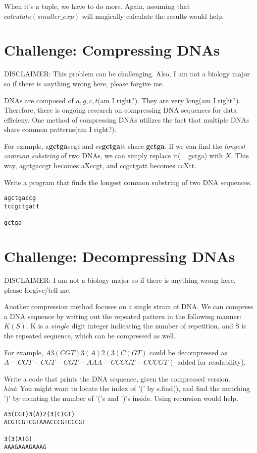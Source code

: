 \documentclass{article}
\begin{document}
When it's a tuple, we have to do more. Again, assuming that
$calculate(smaller\_exp)$ will magically calculate the results would help.\\

\section{Challenge: Compressing DNAs}
DISCLAIMER: This problem can be challenging. Also, I am not a biology major so if there is anything wrong here, please
forgive me.

DNAs are composed of $a,g,c,t$(am I right?). They are very long(am I right?).
Therefore, there is ongoing research on compressing DNA sequences for data
efficieny. One method of compressing DNAs utilizes the fact that multiple DNAs share
common patterns(am I right?).

For example, a\textbf{gctga}ccgt and cc\textbf{gctga}tt share \textbf{gctga}.
If we can find the \textit{longest common substring} of two DNAs, we can simply
replace it(= gctga) with $X$. This way, agctgaccgt becomes aXccgt, and ccgctgatt
becomes ccXtt.

Write a program that finds the longest common substring of two
DNA sequences.

\begin{lstlisting}
agctgaccg
tccgctgatt

gctga
\end{lstlisting}

\section{Challenge: Decompressing DNAs}
DISCLAIMER: I am not a biology major so if there is anything wrong here, please
forgive/tell me.

Another compression method focuses on a single strain of DNA. We can compress a DNA sequence by writing out the repeated pattern
in the following manner: $K(S)$. K is a $single$ digit integer indicating the number of
repetition, and S is the repeated sequence, which can be compressed as well.

For example, $A3(CGT)3(A)2(3(C)GT)$ could be decompressed as\\
$A-CGT-CGT-CGT-AAA-CCCGT-CCCGT$ (- added for readability).

Write a code that prints the DNA sequence, given the compressed version.\\
\textit{hint}: You might want to locate the index of '(' by s.find(), and find the
matching ')' by counting the number of '('s and ')'s inside. Using recursion
would help.

\begin{lstlisting}
A3(CGT)3(A)2(3(C)GT)
ACGTCGTCGTAAACCCGTCCCGT

3(3(A)G)
AAAGAAAGAAAG
\end{lstlisting}
\end{document}
